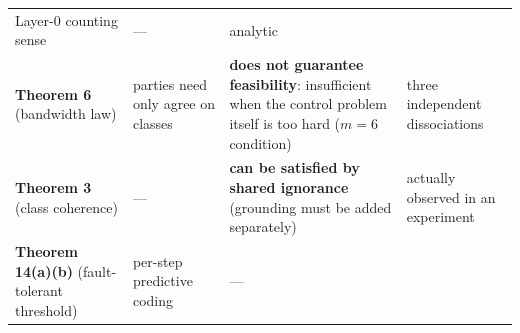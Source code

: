 \documentclass[11pt]{article}
\begin{document}
\begin{longtable}[]{@{}llll@{}}
\begin{minipage}[t]{0.22\columnwidth}
Layer-0 counting sense\strut
\end{minipage} & \begin{minipage}[t]{0.22\columnwidth}\raggedright
---\strut
\end{minipage} & \begin{minipage}[t]{0.22\columnwidth}\raggedright
analytic\strut
\end{minipage}\tabularnewline
\begin{minipage}[t]{0.22\columnwidth}\raggedright
\textbf{Theorem 6} (bandwidth law)\strut
\end{minipage} & \begin{minipage}[t]{0.22\columnwidth}\raggedright
parties need only agree on classes\strut
\end{minipage} & \begin{minipage}[t]{0.22\columnwidth}\raggedright
\textbf{does not guarantee feasibility}: insufficient when the control problem itself is too hard (\(m=6\) condition)\strut
\end{minipage} & \begin{minipage}[t]{0.22\columnwidth}\raggedright
three independent dissociations\strut
\end{minipage}\tabularnewline
\begin{minipage}[t]{0.22\columnwidth}\raggedright
\textbf{Theorem 3} (class coherence)\strut
\end{minipage} & \begin{minipage}[t]{0.22\columnwidth}\raggedright
---\strut
\end{minipage} & \begin{minipage}[t]{0.22\columnwidth}\raggedright
\textbf{can be satisfied by shared ignorance} (grounding must be added separately)\strut
\end{minipage} & \begin{minipage}[t]{0.22\columnwidth}\raggedright
actually observed in an experiment\strut
\end{minipage}\tabularnewline
\begin{minipage}[t]{0.22\columnwidth}\raggedright
\textbf{Theorem 14(a)(b)} (fault-tolerant threshold)\strut
\end{minipage} & \begin{minipage}[t]{0.22\columnwidth}\raggedright
per-step predictive coding\strut
\end{minipage} & \begin{minipage}[t]{0.22\columnwidth}\raggedright
---\strut
\end{minipage} & \begin{minipage}[t]{0.22\columnwidth}\raggedright

\end{minipage}
\end{longtable}
\end{document}
